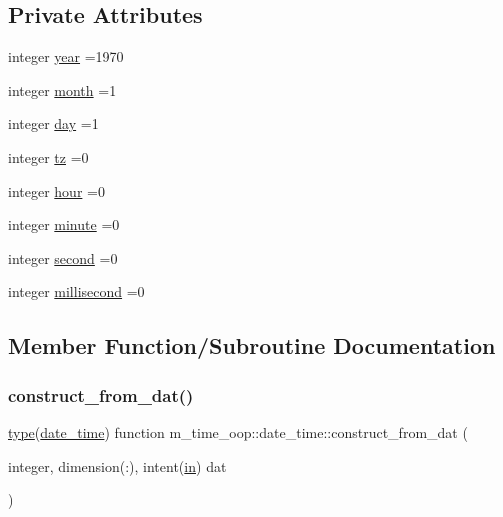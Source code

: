 \subsection*{Private Attributes}
\begin{DoxyCompactItemize}
\item 
integer \hyperlink{structm__time__oop_1_1date__time_a5dfd54357865af0909ec68dff0326306}{year} =1970
\item 
integer \hyperlink{structm__time__oop_1_1date__time_a72c52c8c8474563233a3661177a8e745}{month} =1
\item 
integer \hyperlink{structm__time__oop_1_1date__time_a0f87e80bd7957cdb79d1ae870d2b791a}{day} =1
\item 
integer \hyperlink{structm__time__oop_1_1date__time_ad0338a670b1fa55ff5da4ece0762bd4e}{tz} =0
\item 
integer \hyperlink{structm__time__oop_1_1date__time_a399cdf34783e31997a3d56fda5c318cf}{hour} =0
\item 
integer \hyperlink{structm__time__oop_1_1date__time_a3f16e3293366410be6af1b905d321bba}{minute} =0
\item 
integer \hyperlink{structm__time__oop_1_1date__time_ab1361dc651eb8faf1b176c175f308ba1}{second} =0
\item 
integer \hyperlink{structm__time__oop_1_1date__time_a1c760217b22efc06b23944d464c57907}{millisecond} =0
\end{DoxyCompactItemize}


\subsection{Member Function/\+Subroutine Documentation}
\mbox{\label{structm__time__oop_1_1date__time_a7f2959e5ec90cec4912df6ec3df9a5f5}} 
\subsubsection{\texorpdfstring{construct\+\_\+from\+\_\+dat()}{construct\_from\_dat()}}
{\footnotesize\ttfamily \hyperlink{stop__watch_83_8txt_a70f0ead91c32e25323c03265aa302c1c}{type}(\hyperlink{structm__time__oop_1_1date__time}{date\+\_\+time}) function m\+\_\+time\+\_\+oop\+::date\+\_\+time\+::construct\+\_\+from\+\_\+dat (\begin{DoxyParamCaption}\item[{integer, dimension(\+:), intent(\hyperlink{M__journal_83_8txt_afce72651d1eed785a2132bee863b2f38}{in})}]{dat }\end{DoxyParamCaption})\hspace{0.3cm}{\ttfamily [private]}}

